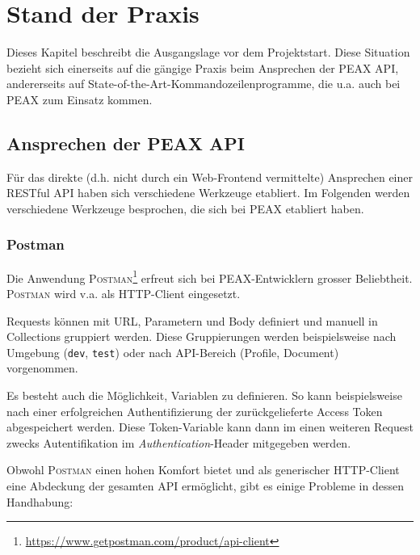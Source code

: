 \section{Stand der Praxis}

Dieses Kapitel beschreibt die Ausgangslage vor dem Projektstart. Diese Situation bezieht sich einerseits auf die gängige Praxis beim Ansprechen der PEAX API, andererseits auf State-of-the-Art-Kommandozeilenprogramme, die u.a. auch bei PEAX zum Einsatz kommen.

\subsection{Ansprechen der PEAX API}

Für das direkte (d.h. nicht durch ein Web-Frontend vermittelte) Ansprechen einer RESTful API haben sich verschiedene Werkzeuge etabliert. Im Folgenden werden verschiedene Werkzeuge besprochen, die sich bei PEAX etabliert haben.

\subsubsection{Postman}

Die Anwendung \textsc{Postman}\footnote{\url{https://www.getpostman.com/product/api-client}} erfreut sich bei PEAX-Entwicklern grosser Beliebtheit. \textsc{Postman} wird v.a. als HTTP-Client eingesetzt.

Requests können mit URL, Parametern und Body definiert und manuell in Collections gruppiert werden. Diese Gruppierungen werden beispielsweise nach Umgebung (\texttt{dev}, \texttt{test}) oder nach API-Bereich (Profile, Document) vorgenommen.

Es besteht auch die Möglichkeit, Variablen zu definieren. So kann beispielsweise nach einer erfolgreichen Authentifizierung der zurückgelieferte Access Token abgespeichert werden. Diese Token-Variable kann dann im einen weiteren Request zwecks Autentifikation im \textit{Authentication}-Header mitgegeben werden.

Obwohl \textsc{Postman} einen hohen Komfort bietet und als generischer HTTP-Client eine Abdeckung der gesamten API ermöglicht, gibt es einige Probleme in dessen Handhabung:

